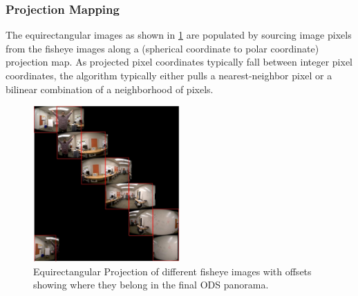 \subsubsection{Projection Mapping}The equirectangular images as shown in \ref{fig:ODS_Proj} are populated by sourcing image pixels from the fisheye images along a (spherical coordinate to polar coordinate) projection map. As projected pixel coordinates typically fall between integer pixel coordinates, the algorithm typically either pulls a nearest-neighbor pixel or a bilinear combination of a neighborhood of pixels. 
\begin{figure}[h]
	\begin{center}
		\includegraphics[width=0.5\textwidth]{data/images/EqRect_offset_fov_viz_loop_v3.jpg}
		\caption{Equirectangular Projection of different fisheye images with offsets showing where they belong in the final ODS panorama.}
		\label{fig:ODS_Proj}
	\end{center}
\end{figure} 

